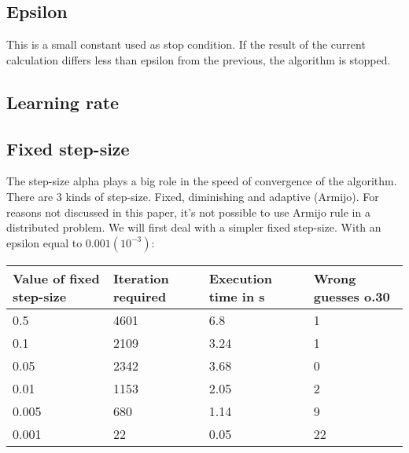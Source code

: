 \documentclass[a4paper,11pt,oneside]{book}
\begin{document}
\subsection{Epsilon} \label{Subsec2.2.2}
This is a small constant used as stop condition. If the result of the current calculation differs less than epsilon from the previous, the algorithm is stopped.

\subsection{Learning rate} \label{Subsec2.2.3}

\subsection{Fixed step-size} \label{Subsec2.2.4}
The step-size alpha plays a big role in the speed of convergence of the algorithm. There are 3 kinds of step-size. Fixed, diminishing and adaptive (Armijo). For reasons not discussed in this paper, it's not possible to use Armijo rule in a distributed problem. We will first deal with a simpler fixed step-size. With an epsilon equal to $0.001 (10^{-3})$:\\
\begin{tabularx}{\textwidth}{|X|X|X|X|}
\hline
\textbf{Value of fixed step-size} & \textbf{Iteration required} & \textbf{Execution time in s} & \textbf{Wrong guesses o.30}\\
\hline
0.5 & 4601 & 6.8 & 1\\
\hline
0.1 & 2109 & 3.24 & 1\\
\hline
0.05 & 2342 & 3.68 & 0\\
\hline
0.01 & 1153 & 2.05 & 2\\
\hline
0.005 & 680 & 1.14 & 9\\
\hline
0.001 & 22 & 0.05 & 22\\
\hline
\end{tabularx}
\end{document}
